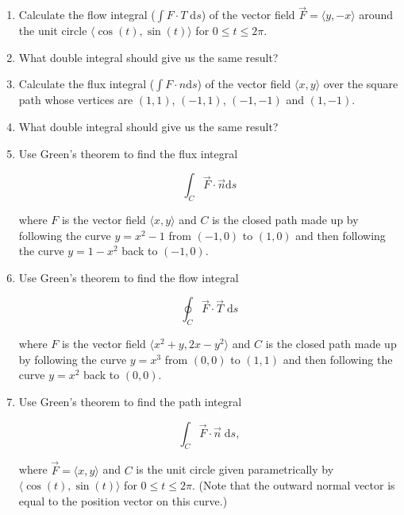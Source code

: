 \documentclass{amsart}
\newcommand{\ds}{\;\mbox{d}s}
\begin{document}
\begin{enumerate}

\item Calculate the flow integral ($\int F \cdot T \ds$) of the
vector field $\vec{F} = \langle y, -x \rangle$ around the unit circle
$\langle \cos{(t)}, \sin{(t)} \rangle$ for $0 \leq t \leq 2\pi$.

\vfill

\vfill

\item What double integral should give us the same result?

\vfill

\newpage

\item Calculate the flux integral ($\int F \cdot n \mbox{d}s$) of the 
vector field $\langle x, y \rangle$ over the square path whose vertices
are $(1,1)$, $(-1,1)$, $(-1,-1)$ and $(1,-1)$. 

\vfill

\vfill

\item What double integral should give us the same result?

\vfill

\newpage

\item Use Green's theorem to find the flux integral 

\[ \int_C \vec{F} \cdot \vec{n} \mbox{d}s \]

\noindent where $F$ is the vector field $\langle x, y \rangle$ and $C$
is the closed path made up by following the curve $y=x^2-1$ from
$(-1,0)$ to $(1,0)$ and then following the curve $y = 1 - x^2$ back to
$(-1,0)$.


\newpage

\item Use Green's theorem to find the flow integral 

\[ \oint_C \vec{F} \cdot \vec{T} \ds \]

\noindent where $F$ is the vector field $\langle x^2+y, 2x-y^2 \rangle$ and $C$
is the closed path made up by following the curve $y=x^3$ from
$(0,0)$ to $(1,1)$ and then following the curve $y = x^2$ back to
$(0,0)$. 


\newpage


\item Use Green's theorem to find the path integral 

\[ \int_C \vec{F} \cdot \vec{n} \; \mbox{d}s, \]

where $\vec{F} = \langle x, y \rangle$ and $C$ is the unit circle 
given parametrically by $\langle \cos{(t)}, \sin{(t)} \rangle$ for
$0 \leq t \leq 2\pi$.  (Note that the outward normal vector is equal to the
position vector on this curve.)


\end{enumerate}
\end{document}

